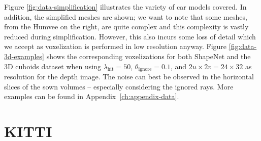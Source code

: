 Figure \ref{fig:data-simplification} illustrates the variety of car models covered.
In addition, the simplified meshes are shown; we want to note that
some meshes, \eg from the Humvee on the right, are quite complex and this
complexity is vastly reduced during simplification. However, this also
incurs some loss of detail which we accept as voxelization is performed in
low resolution anyway. Figure \ref{fig:data-3d-examples} shows the corresponding voxelizations
for both ShapeNet and the 3D cuboids dataset when using
$\lambda_{\text{hit}} = 50$, $\theta_{\text{ignore}} = 0.1$, and
$2u \times 2v = 24 \times 32$ as resolution for the depth image. The noise
can best be observed in the horizontal slices of the sown volumes
-- especially considering the ignored rays.
More examples can be found in Appendix~\ref{ch:appendix-data}.

\section{KITTI}
\label{sec:data-kitti}

    
    
    

